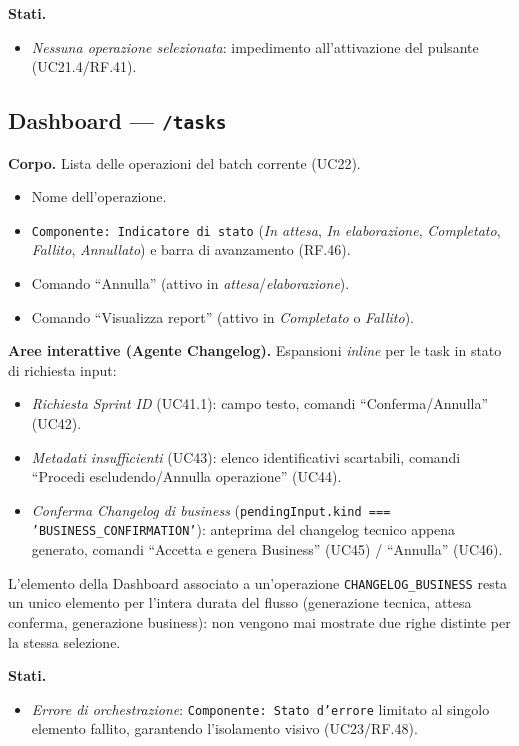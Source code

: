 \documentclass[11pt,a4paper]{article}
\begin{document}
\textbf{Stati.}
\begin{itemize}
    \item \emph{Nessuna operazione selezionata}: impedimento all'attivazione del pulsante (UC21.4/RF.41).
\end{itemize}

\subsection{Dashboard --- \texttt{/tasks}}

\textbf{Corpo.} Lista delle operazioni del batch corrente (UC22).
\begin{itemize}
    \item Nome dell'operazione.
    \item \texttt{Componente: Indicatore di stato} (\emph{In attesa}, \emph{In elaborazione}, \emph{Completato}, \emph{Fallito}, \emph{Annullato}) e barra di avanzamento (RF.46).
    \item Comando ``Annulla'' (attivo in \emph{attesa}/\emph{elaborazione}).
    \item Comando ``Visualizza report'' (attivo in \emph{Completato} o \emph{Fallito}).
\end{itemize}

\textbf{Aree interattive (Agente Changelog).} Espansioni \emph{inline} per le task in stato di richiesta input:
\begin{itemize}
    \item \emph{Richiesta Sprint ID} (UC41.1): campo testo, comandi ``Conferma/Annulla'' (UC42).
    \item \emph{Metadati insufficienti} (UC43): elenco identificativi scartabili, comandi ``Procedi escludendo/Annulla operazione'' (UC44).
    \item \emph{Conferma Changelog di business} (\texttt{pendingInput.kind === 'BUSINESS\_CONFIRMATION'}): anteprima del changelog tecnico appena generato, comandi ``Accetta e genera Business'' (UC45) / ``Annulla'' (UC46).
\end{itemize}

L'elemento della Dashboard associato a un'operazione \texttt{CHANGELOG\_BUSINESS} resta un unico elemento per l'intera durata del flusso (generazione tecnica, attesa conferma, generazione business): non vengono mai mostrate due righe distinte per la stessa selezione.

\textbf{Stati.}
\begin{itemize}
    \item \emph{Errore di orchestrazione}: \texttt{Componente: Stato d'errore} limitato al singolo elemento fallito, garantendo l'isolamento visivo (UC23/RF.48).
\end{itemize}
\end{document}
